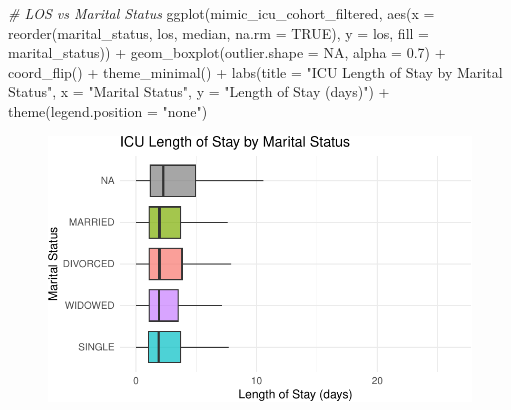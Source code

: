 \documentclass[
]{article}
\newenvironment{Shaded}{\begin{snugshade}}{\end{snugshade}}
\newcommand{\AttributeTok}[1]{\textcolor[rgb]{0.77,0.63,0.00}{#1}}
\newcommand{\CommentTok}[1]{\textcolor[rgb]{0.56,0.35,0.01}{\textit{#1}}}
\newcommand{\ConstantTok}[1]{\textcolor[rgb]{0.00,0.00,0.00}{#1}}
\newcommand{\FloatTok}[1]{\textcolor[rgb]{0.00,0.00,0.81}{#1}}
\newcommand{\FunctionTok}[1]{\textcolor[rgb]{0.00,0.00,0.00}{#1}}
\newcommand{\NormalTok}[1]{\textcolor[rgb]{0.00,0.00,0.00}{#1}}
\newcommand{\SpecialCharTok}[1]{\textcolor[rgb]{0.00,0.00,0.00}{#1}}
\newcommand{\StringTok}[1]{\textcolor[rgb]{0.31,0.60,0.02}{#1}}
\begin{document}
\begin{Shaded}
\begin{Highlighting}[]
\CommentTok{\# LOS vs Marital Status}
\FunctionTok{ggplot}\NormalTok{(mimic\_icu\_cohort\_filtered, }\FunctionTok{aes}\NormalTok{(}\AttributeTok{x =} \FunctionTok{reorder}\NormalTok{(marital\_status, los, }
\NormalTok{                                                  median, }\AttributeTok{na.rm =} \ConstantTok{TRUE}\NormalTok{), }
                                      \AttributeTok{y =}\NormalTok{ los, }\AttributeTok{fill =}\NormalTok{ marital\_status)) }\SpecialCharTok{+}
  \FunctionTok{geom\_boxplot}\NormalTok{(}\AttributeTok{outlier.shape =} \ConstantTok{NA}\NormalTok{, }\AttributeTok{alpha =} \FloatTok{0.7}\NormalTok{) }\SpecialCharTok{+}
  \FunctionTok{coord\_flip}\NormalTok{() }\SpecialCharTok{+}
  \FunctionTok{theme\_minimal}\NormalTok{() }\SpecialCharTok{+}
  \FunctionTok{labs}\NormalTok{(}\AttributeTok{title =} \StringTok{"ICU Length of Stay by Marital Status"}\NormalTok{, }\AttributeTok{x =} \StringTok{"Marital Status"}\NormalTok{, }
       \AttributeTok{y =} \StringTok{"Length of Stay (days)"}\NormalTok{) }\SpecialCharTok{+}
  \FunctionTok{theme}\NormalTok{(}\AttributeTok{legend.position =} \StringTok{"none"}\NormalTok{)}
\end{Highlighting}
\end{Shaded}

\begin{figure}[H]

{\centering \includegraphics{hw3_files/figure-pdf/8.4-1.pdf}

}

\end{figure}
\end{document}
